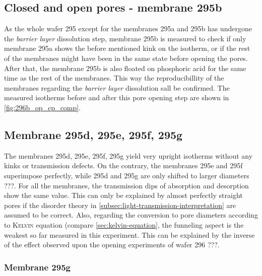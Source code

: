 \documentclass[thesis.tex]{subfiles}
\begin{document}
                


        \subsection{Closed and open pores - membrane 295b}

          As the whole wafer 295 except for the membranes 295a and 295b has undergone the \textit{barrier layer} dissolution step, membrane 295b is measured to check if only membrane 295a shows the before mentioned kink on the isotherm, or if the rest of the membranes might have been in the same state before opening the pores. After that, the membrane 295b is also floated on phosphoric acid for the same time as the rest of the membranes. This way the reproducibillity of the membranes regarding the \textit{barrier layer} dissolution sall be confirmed. The measured isotherms before and after this pore opening step are shown in \cref{fig:296b_op_cp_comp}.

          


        \subsection{Membrane 295d, 295e, 295f, 295g}

            The membranes 295d, 295e, 295f, 295g yield very upright isotherms without any kinks or transmission defects. On the contrary, the membranes 295e and 295f superimpose perfectly, while 295d and 295g are only shifted to larger diameters ???. For all the membranes, the transmission dips of absorption and desorption show the same value. This can only be explained by almost perfectly straight pores if the disorder theory in \cref{subsec:light-transmission-interpretation} are assumed to be correct. Also, regarding the conversion to pore diameters according to \textsc{Kelvin} equation (compare \cref{sec:kelvin-equation}, the funneling aspect is the weakest so far measured in this experiment. This can be explained by the inverse of the effect observed upon the opening experiments of wafer 296 ???.


            \subsubsection{Membrane 295g}
\end{document}
